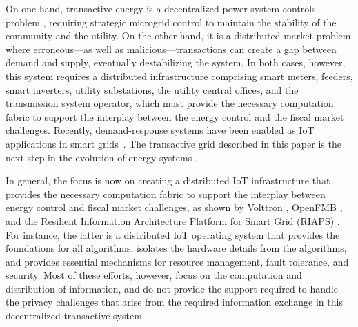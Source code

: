 On one hand, transactive energy is a decentralized power system
controls problem \cite{7452738}, requiring strategic microgrid control
to maintain the stability of the community and the utility. On the
other hand, it is a distributed market problem where erroneous---as
well as malicious---transactions can create a gap between demand and
supply, eventually destabilizing the system. In both cases, however,
this system requires a distributed infrastructure comprising smart
meters, feeders, smart inverters, utility substations, the utility
central offices, and the transmission system operator, which must
provide the necessary computation fabric to support the interplay
between the energy control and the fiscal market challenges.
Recently, demand-response systems have been enabled as IoT
applications in smart grids~\cite{Haider2016166}. The transactive grid
described in this paper is the next step in the evolution of energy
systems \cite{collier2017emerging}.

In general, the focus is now on creating a distributed IoT
infrastructure that provides the necessary computation fabric to
support the interplay between energy control and fiscal market
challenges, as shown by Volttron \cite{katipamula2016volttron},
OpenFMB \cite{gunthersmart}, and the Resilient Information
Architecture Platform for Smart Grid (RIAPS)
\cite{eisele2017riaps,Scott2017ICCPS}. For instance, the latter is a
distributed IoT operating system that provides the foundations for all
algorithms, isolates the hardware details from the algorithms, and
provides essential mechanisms for resource management, fault
tolerance, and security. Most of these efforts, however, focus on the
computation and distribution of information, and do not provide the
support required to handle the privacy challenges that arise from the
required information exchange in this decentralized transactive
system.

